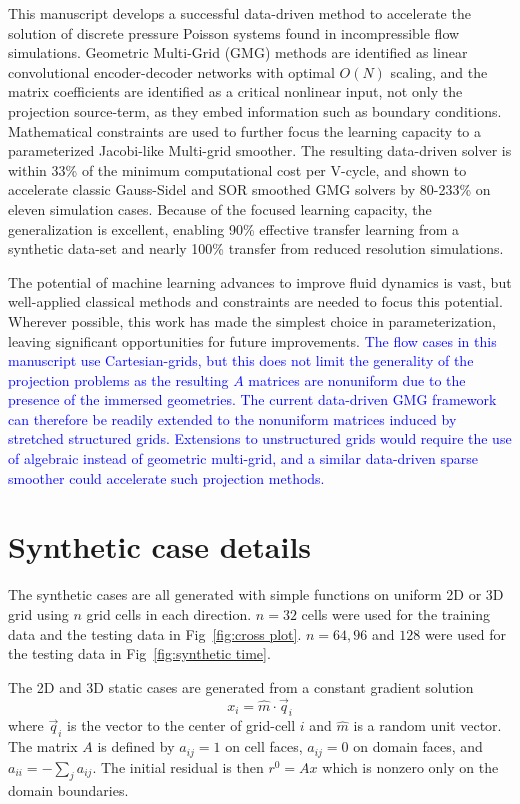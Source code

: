 \documentclass[]{elsarticle}
\begin{document}
This manuscript develops a successful data-driven method to accelerate the solution of discrete pressure Poisson systems found in incompressible flow simulations. Geometric Multi-Grid (GMG) methods are identified as linear convolutional encoder-decoder networks with optimal $O(N)$ scaling, and the matrix coefficients are identified as a critical nonlinear input, not only the projection source-term, as they embed information such as boundary conditions. Mathematical constraints are used to further focus the learning capacity to a parameterized Jacobi-like Multi-grid smoother. The resulting data-driven solver is within 33\% of the minimum computational cost per V-cycle, and shown to accelerate classic Gauss-Sidel and SOR smoothed GMG solvers by 80-233\% on eleven simulation cases. Because of the focused learning capacity, the generalization is excellent, enabling 90\% effective transfer learning from a synthetic data-set and nearly 100\% transfer from reduced resolution simulations.

The potential of machine learning advances to improve fluid dynamics is vast, but well-applied classical methods and constraints are needed to focus this potential. Wherever possible, this work has made the simplest choice in parameterization, leaving significant opportunities for future improvements. \textcolor{blue}{The flow cases in this manuscript use Cartesian-grids, but this does not limit the generality of the projection problems as the resulting $A$ matrices are nonuniform due to the presence of the immersed geometries. The current data-driven GMG framework can therefore be readily extended to the nonuniform matrices induced by stretched structured grids. Extensions to unstructured grids would require the use of algebraic instead of geometric multi-grid, and a similar data-driven sparse smoother could accelerate such projection methods.}


\color{blue}
\appendix
\section{Synthetic case details}\label{app synth}

The synthetic cases are all generated with simple functions on uniform 2D or 3D grid using $n$ grid cells in each direction. $n=32$ cells were used for the training data and the testing data in Fig~\ref{fig:cross plot}. $n=64,96$ and $128$ were used for the testing data in Fig~\ref{fig:synthetic time}.

The 2D and 3D static cases are generated from a constant gradient solution
$$ x_i = \hat m \cdot \vec q_i$$
where $\vec q_i$ is the vector to the center of grid-cell $i$ and $\hat m$ is a random unit vector. The matrix $A$ is defined by $a_{ij}=1$ on cell faces, $a_{ij}=0$ on domain faces, and $a_{ii}=-\sum_j a_{ij}$. The initial residual is then $r^0=A x$ which is nonzero only on the domain boundaries.
\end{document}
